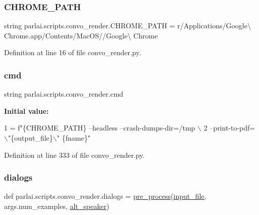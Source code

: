 \subsubsection{\texorpdfstring{C\+H\+R\+O\+M\+E\+\_\+\+P\+A\+TH}{CHROME\_PATH}}
{\footnotesize\ttfamily string parlai.\+scripts.\+convo\+\_\+render.\+C\+H\+R\+O\+M\+E\+\_\+\+P\+A\+TH = r\textquotesingle{}/Applications/Google\textbackslash{} Chrome.\+app/Contents/Mac\+OS//Google\textbackslash{} Chrome\textquotesingle{}}



Definition at line 16 of file convo\+\_\+render.\+py.

\mbox{\label{namespaceparlai_1_1scripts_1_1convo__render_a6fdef78374ed4101104137135c6764a7}} 
\subsubsection{\texorpdfstring{cmd}{cmd}}
{\footnotesize\ttfamily string parlai.\+scripts.\+convo\+\_\+render.\+cmd}

{\bfseries Initial value\+:}
\begin{DoxyCode}
1 =  f\textcolor{stringliteral}{"\{CHROME\_PATH\} --headless --crash-dumps-dir=/tmp \(\backslash\)}
2 \textcolor{stringliteral}{                     --print-to-pdf=\(\backslash\)"\{output\_file\}\(\backslash\)" \{fname\}"}
\end{DoxyCode}


Definition at line 333 of file convo\+\_\+render.\+py.

\mbox{\label{namespaceparlai_1_1scripts_1_1convo__render_afbcbefbded116f916dd045b2042074c2}} 
\subsubsection{\texorpdfstring{dialogs}{dialogs}}
{\footnotesize\ttfamily def parlai.\+scripts.\+convo\+\_\+render.\+dialogs = \hyperlink{namespaceparlai_1_1scripts_1_1convo__render_a0f0a031443ca797c936d2961a702a45e}{pre\+\_\+process}(\hyperlink{namespaceparlai_1_1scripts_1_1convo__render_a708724a5430d3e0236e76dc23ed66801}{input\+\_\+file}, args.\+num\+\_\+examples, \hyperlink{namespaceparlai_1_1scripts_1_1convo__render_a516a38b04ed5b7cf0c03ed2ea0e99d46}{alt\+\_\+speaker})}



